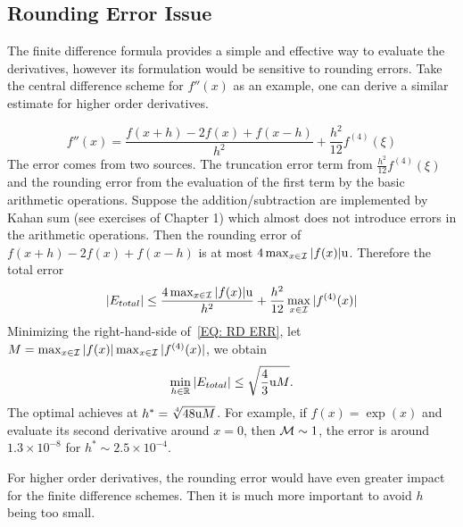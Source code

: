 \subsection{Rounding Error Issue}
The finite difference formula provides a simple and effective way to evaluate the derivatives, however its formulation would be sensitive to rounding errors. Take the central difference scheme for $f''(x)$ as an example, one can derive a similar estimate for higher order derivatives.
\begin{example}
    \begin{equation}
        f''(x) = \frac{f(x + h) - 2 f(x) + f(x - h)}{h^2} + \frac{h^2}{12}f^{(4)} (\xi)
    \end{equation}
    The error comes from two sources. The truncation error term from $\frac{h^2}{12} f^{(4)}(\xi)$ and the rounding error from the evaluation of the first term by the basic arithmetic operations.  Suppose the addition/subtraction are implemented by Kahan sum (see exercises of Chapter 1) which almost does not introduce errors in the arithmetic operations. Then the rounding error of $f(x + h) - 2 f(x) + f(x - h)$ is at most $4 \max_{x\in \mathcal I} |f(x) | \textup{u}$.  Therefore the total error
    \begin{equation}\label{EQ: RD ERR}
        |E_{total}|\le \frac{4 \max_{x\in \mathcal I} |f(x) | \textup{u}}{h^2} + \frac{h^2}{12} \max_{x\in \mathcal I} |f^{(4)} (x)|
    \end{equation}
    Minimizing the right-hand-side of~\eqref{EQ: RD ERR}, let $M = \max_{x\in\mathcal I} |f(x)| \max_{x\in\mathcal I} |f^{(4)}(x)|$, we obtain 
    $$\min_{h\in\mathbb R} |E_{total}| \le \sqrt{\frac{4}{3}\textup{u} M }.$$
    The optimal achieves at $h^{\ast} = \sqrt[4]{48\textup{u}M}$. For example, if $f(x) = \exp(x)$ and evaluate its second derivative around $x = 0$, then $\mathcal M\sim 1$, the error is around $1.3\times 10^{-8}$ for $h^{\ast}\sim 2.5\times 10^{-4}$. 
\end{example}
For higher order derivatives, the rounding error would have even greater impact for the finite difference schemes. Then it is much more important to avoid $h$ being too small. 
